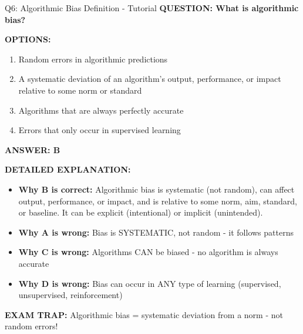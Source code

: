 \documentclass[8pt]{beamer}
\begin{document}
	\begin{frame}{Q6: Algorithmic Bias Definition - Tutorial}
		\fontsize{6.5}{7.5}\selectfont
		\textbf{QUESTION: What is algorithmic bias?}
		
		\vspace{0.1cm}
		\textbf{OPTIONS:}
		\begin{enumerate}
			\item Random errors in algorithmic predictions
			\item A systematic deviation of an algorithm's output, performance, or impact relative to some norm or standard
			\item Algorithms that are always perfectly accurate
			\item Errors that only occur in supervised learning
		\end{enumerate}
		
		\vspace{0.1cm}
		\textcolor{myblue}{\textbf{ANSWER: B}}
		
		\vspace{0.1cm}
		\textbf{DETAILED EXPLANATION:}
		\begin{itemize}
			\item \textbf{Why B is correct:} Algorithmic bias is systematic (not random), can affect output, performance, or impact, and is relative to some norm, aim, standard, or baseline. It can be explicit (intentional) or implicit (unintended).
			\item \textbf{Why A is wrong:} Bias is SYSTEMATIC, not random - it follows patterns
			\item \textbf{Why C is wrong:} Algorithms CAN be biased - no algorithm is always accurate
			\item \textbf{Why D is wrong:} Bias can occur in ANY type of learning (supervised, unsupervised, reinforcement)
		\end{itemize}
		
		\textcolor{myred}{\textbf{EXAM TRAP:}} Algorithmic bias = \textcolor{myblue}{systematic deviation from a norm} - not random errors!
	\end{frame}
	
\end{document}
